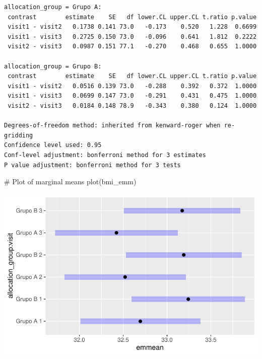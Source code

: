 \documentclass[
  letterpaper,
  DIV=11,
  numbers=noendperiod]{scrartcl}
\newenvironment{Shaded}{\begin{snugshade}}{\end{snugshade}}
\newcommand{\CommentTok}[1]{\textcolor[rgb]{0.37,0.37,0.37}{#1}}
\newcommand{\FunctionTok}[1]{\textcolor[rgb]{0.28,0.35,0.67}{#1}}
\newcommand{\NormalTok}[1]{\textcolor[rgb]{0.00,0.23,0.31}{#1}}
\begin{document}
\begin{verbatim}
allocation_group = Grupo A:
 contrast        estimate    SE   df lower.CL upper.CL t.ratio p.value
 visit1 - visit2   0.1738 0.141 73.0   -0.173    0.520   1.228  0.6699
 visit1 - visit3   0.2725 0.150 73.0   -0.096    0.641   1.812  0.2222
 visit2 - visit3   0.0987 0.151 77.1   -0.270    0.468   0.655  1.0000

allocation_group = Grupo B:
 contrast        estimate    SE   df lower.CL upper.CL t.ratio p.value
 visit1 - visit2   0.0516 0.139 73.0   -0.288    0.392   0.372  1.0000
 visit1 - visit3   0.0699 0.147 73.0   -0.291    0.431   0.475  1.0000
 visit2 - visit3   0.0184 0.148 78.9   -0.343    0.380   0.124  1.0000

Degrees-of-freedom method: inherited from kenward-roger when re-gridding 
Confidence level used: 0.95 
Conf-level adjustment: bonferroni method for 3 estimates 
P value adjustment: bonferroni method for 3 tests 
\end{verbatim}

\begin{Shaded}
\begin{Highlighting}[]
\CommentTok{\# Plot of marginal means}
\FunctionTok{plot}\NormalTok{(bmi\_emm)}
\end{Highlighting}
\end{Shaded}

\includegraphics{Outcomes_V1V2V3_files/figure-pdf/bmi_sens_emm-1.pdf}
\end{document}
